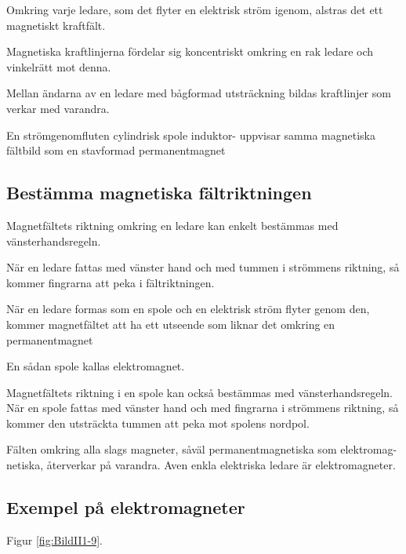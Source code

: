 Omkring varje ledare, som det flyter en elektrisk ström igenom, alstras det ett
magnetiskt kraftfält.

Magnetiska kraftlinjerna fördelar sig koncentriskt omkring en rak ledare och vinkelrätt
mot denna.

Mellan ändarna av en ledare med bågformad utsträckning bildas kraftlinjer som verkar med
varandra.

En strömgenomfluten cylindrisk spole induktor- uppvisar samma magnetiska fältbild som en stavformad permanentmagnet

\subsection{Bestämma magnetiska fältriktningen}

Magnetfältets riktning omkring en ledare kan enkelt bestämmas med vänsterhandsregeln.

När en ledare fattas med vänster hand och med tummen i strömmens riktning, så
kommer fingrarna att peka i fältriktningen.

När en ledare formas som en spole och en elektrisk ström flyter genom den, kommer
magnetfältet att ha ett utseende som liknar det omkring en permanentmagnet

En sådan spole kallas elektromagnet.

Magnetfältets riktning i en spole kan också bestämmas med vänsterhandsregeln.
När en spole fattas med vänster hand och med fingrarna i strömmens riktning, så
kommer den utsträckta tummen att peka mot spolens nordpol.

Fälten omkring alla slags magneter, såväl permanentmagnetiska som elektromag-
netiska, återverkar på varandra. Aven enkla
elektriska ledare är elektromagneter.

\subsection{Exempel på elektromagneter}

Figur \ref{fig:BildII1-9}.


